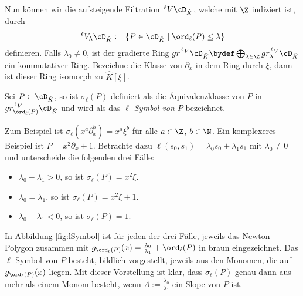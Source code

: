 Nun können wir die aufsteigende Filtration $\,^\ell V\cD_{\hat K}$, welche mit
$\Z$ indiziert ist, durch
\[
\,^\ell V_\lambda\cD_{\hat K}:=\{P\in\cD_{\hat K}\mid \ord_\ell(P)\leq \lambda\}
\]
definieren.
Falls $\lambda_0\neq 0$, ist der gradierte Ring $gr^{\,^\ell V}\cD_{\hat
K}\bydef \bigoplus_{\lambda \in \Z}gr_\lambda^{\,^\ell V}\cD_{\hat K}$ ein
kommutativer Ring. Bezeichne die Klasse von $\partial_x$ in dem Ring durch
$\xi$, dann ist dieser Ring isomorph zu $\hat K[\xi]$.
\begin{defn}
Sei $P\in \cD_{\hat K}$, so ist $\sigma_\ell(P)$ definiert als die
Äquivalenzklasse von $P$ in $gr_{\ord_\ell(P)}^{\,^\ell V}\cD_{\hat K}$ und
wird als das \emph{$\ell$-Symbol von $P$} bezeichnet.
\end{defn}
\begin{bsp} \label{exmp:lSymbol}
Zum Beispiel ist $\sigma_\ell(x^a\partial_x^b)=x^a\xi^b$ für alle
$a\in\Z$, $b\in\N$. Ein komplexeres Beispiel ist $P=x^2\partial_x+1$. Betrachte
dazu $\ell(s_0,s_1)=\lambda_0s_0+\lambda_1s_1$ mit $\lambda_0\neq0$ und
unterscheide die folgenden drei Fälle:
\begin{itemize}
\item $\lambda_0-\lambda_1>0$, so ist $\sigma_\ell(P)=x^2\xi$.
\item $\lambda_0=\lambda_1$, so ist $\sigma_\ell(P)=x^2\xi+1$.
\item $\lambda_0-\lambda_1<0$, so ist $\sigma_\ell(P)=1$.
\end{itemize}
In Abbildung \ref{fig:lSymbol} ist für jeden der drei Fälle, jeweils das
Newton-Polygon zusammen mit
$g_{\ord_\ell(P)}(x)=\frac{\lambda_0}{\lambda_1}+\ord_\ell(P)$ in braun
eingezeichnet. Das $\ell$-Symbol von $P$ besteht, bildlich vorgestellt, jeweils
aus den Monomen, die auf $g_{\ord_\ell(P)}(x)$ \glqq liegen\grqq. Mit dieser
Vorstellung ist klar, dass $\sigma_\ell(P)$ genau dann aus mehr als einem
Monom besteht, wenn $\Lambda:=\frac{\lambda_0}{\lambda_1}$ ein Slope von $P$
ist.
\begin{figure}[H] %
  \begin{minipage}[hbt]{0,32\textwidth}
    \begin{center}
\end{center}
\end{minipage}
\end{figure}
\end{bsp}
